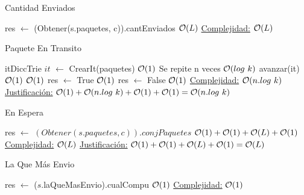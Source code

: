 \begin{Algoritmos}
\begin{algorithm}
\caption{Cantidad Enviados}
\begin{algorithmic}[1]
   \State res $\gets$ (Obtener(s.paquetes, c)).cantEnviados \Comment $\mathcal{O}(L)$
  \EndProcedure
   \underline{Complejidad:} $\mathcal{O}(L)$
\end{algorithmic}
\end{algorithm}


\begin{algorithm}
\caption{Paquete En Transito}
\begin{algorithmic}[1]
   \State itDiccTrie $it$ $\gets$ CrearIt(paquetes) \Comment $\mathcal{O}(1)$
    \Comment Se repite n veces $\mathcal{O}(log \ k)$ 
   \State avanzar(it) \Comment $\mathcal{O}(1)$
	\EndWhile  
	 \Comment $\mathcal{O}(1)$
	\State res $\gets$   True \Comment $\mathcal{O}(1)$
	\Else  
	\State res $\gets$ False \Comment $\mathcal{O}(1)$
	\EndIf 
  \EndProcedure
    \underline{Complejidad:} $\mathcal{O}(n.log \ k)$
 \underline{Justificación:} $\mathcal{O}(1)+\mathcal{O}(n.log \ k )+\mathcal{O}(1)+\mathcal{O}(1) = \mathcal{O}(n.log \ k)$
\end{algorithmic}
\end{algorithm}




\begin{algorithm}
\caption{En Espera}
\begin{algorithmic}[1]
    \State res $\gets$ $(Obtener(s.paquetes,c)).conjPaquetes$ \Comment $\mathcal{O}(1)+\mathcal{O}(1)+\mathcal{O}(L)+\mathcal{O}(1)$
  \EndProcedure
  \underline{Complejidad:} $\mathcal{O}(L)$
 \underline{Justificación:} $\mathcal{O}(1)+\mathcal{O}(1)+\mathcal{O}(L)+\mathcal{O}(1) = \mathcal{O}(L)$

\end{algorithmic}
\end{algorithm}


\begin{algorithm}
\caption{La Que Más Envio}
\begin{algorithmic}[1]
   \State res $\gets$   ($s$.laQueMasEnvio).cualCompu \Comment $\mathcal{O}(1)$
  \EndProcedure
  \underline{Complejidad:} $\mathcal{O}(1)$
\end{algorithmic}
\end{algorithm}



\end{Algoritmos}

